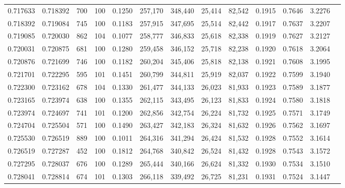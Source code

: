 \begin{tabular}{rrrrrrrrrrrrr}
0.717633 & 0.718392 &   700 & 100 &                                     0.1250 & 257,170 & 348,440 &  25,414 &  82,542 & 0.1915 & 0.7646 & 3.2276 \\
0.718392 & 0.719084 &   745 & 100 &                                     0.1183 & 257,915 & 347,695 &  25,514 &  82,442 & 0.1917 & 0.7637 & 3.2207 \\
0.719085 & 0.720030 &   862 & 104 &                                     0.1077 & 258,777 & 346,833 &  25,618 &  82,338 & 0.1919 & 0.7627 & 3.2127 \\
0.720031 & 0.720875 &   681 & 100 &                                     0.1280 & 259,458 & 346,152 &  25,718 &  82,238 & 0.1920 & 0.7618 & 3.2064 \\
0.720876 & 0.721699 &   746 & 100 &                                     0.1182 & 260,204 & 345,406 &  25,818 &  82,138 & 0.1921 & 0.7608 & 3.1995 \\
0.721701 & 0.722295 &   595 & 101 &                                     0.1451 & 260,799 & 344,811 &  25,919 &  82,037 & 0.1922 & 0.7599 & 3.1940 \\
0.722300 & 0.723162 &   678 & 104 &                                     0.1330 & 261,477 & 344,133 &  26,023 &  81,933 & 0.1923 & 0.7589 & 3.1877 \\
0.723165 & 0.723974 &   638 & 100 &                                     0.1355 & 262,115 & 343,495 &  26,123 &  81,833 & 0.1924 & 0.7580 & 3.1818 \\
0.723974 & 0.724697 &   741 & 101 &                                     0.1200 & 262,856 & 342,754 &  26,224 &  81,732 & 0.1925 & 0.7571 & 3.1749 \\
0.724704 & 0.725504 &   571 & 100 &                                     0.1490 & 263,427 & 342,183 &  26,324 &  81,632 & 0.1926 & 0.7562 & 3.1697 \\
0.725530 & 0.726519 &   889 & 100 &                                     0.1011 & 264,316 & 341,294 &  26,424 &  81,532 & 0.1928 & 0.7552 & 3.1614 \\
0.726519 & 0.727287 &   452 & 100 &                                     0.1812 & 264,768 & 340,842 &  26,524 &  81,432 & 0.1928 & 0.7543 & 3.1572 \\
0.727295 & 0.728037 &   676 & 100 &                                     0.1289 & 265,444 & 340,166 &  26,624 &  81,332 & 0.1930 & 0.7534 & 3.1510 \\
0.728041 & 0.728814 &   674 & 101 &                                     0.1303 & 266,118 & 339,492 &  26,725 &  81,231 & 0.1931 & 0.7524 & 3.1447 \\

\end{tabular}
